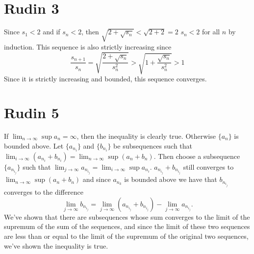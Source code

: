 \documentclass{article}
\begin{document}
\section*{Rudin 3}
Since $s_1 < 2$ and if $s_n < 2$, then $\sqrt{2 + \sqrt{s_n}} < \sqrt{2 + 2} = 2$
$s_n < 2$ for all $n$ by induction.
This sequence is also strictly increasing since 
\[
	\frac{s_{n+1}}{s_n} = \sqrt{\frac{2+\sqrt{s_n}}{s_n^2}} > \sqrt{1+ \frac{\sqrt{s_n}}{s_n^2}} > 1
\]
Since it is strictly increasing and bounded, this sequence converges.
\newpage 

\section*{Rudin 5}
If $\lim_{n \to \infty} \sup a_n = \infty$, then the inequality is clearly true.
Otherwise $\{a_n\}$ is bounded above. Let $\{a_{n_i}\}$ and $\{b_{n_i}\}$ be subsequences such that 
$\lim_{i \to \infty} (a_{n_i} + b_{n_i}) = \lim_{n \to \infty} \sup (a_n + b_n)$.
Then choose a subsequence $\{a_{n_{i_j}}\}$ such that $\lim_{j \to \infty}  a_{n_{i_j}} = \lim_{i \to \infty}  \sup a_{n_i}$.
$a_{n_{i_j}} + b_{n_{i_j}}$ still converges to  $\lim_{n \to \infty}  \sup (a_n + b_n)$
and since $a_{n_k}$ is bounded above we have that $b_{n_{i_j}}$ converges to the difference
\[
	\lim_{j \to \infty} b_{n_{i_j}} = \lim_{j \to \infty}  (a_{n_{i_j}} + b_{n_{i_j}}) - \lim_{j \to \infty} a_{n_{i_j}}.
\]
We've shown that there are subsequences whose sum converges to the limit of the supremum
of the sum of the sequences, and since the limit of these two sequences 
are less than or equal to the limit of the supremum of the original two sequences,
we've shown the inequality is true.
\end{document}
